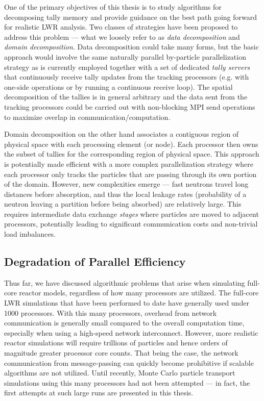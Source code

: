 One of the primary objectives of this thesis is to study algorithms for
decomposing tally memory and provide guidance on the best path going forward for
realistic LWR analysis. Two classes of strategies have been proposed to address
this problem --- what we loosely refer to as \emph{data decomposition} and
\emph{domain decomposition}. Data decomposition could take many forms, but the
basic approach would involve the same naturally parallel by-particle
parallelization strategy as is currently employed together with a set of
dedicated \emph{tally servers} that continuously receive tally updates from the
tracking processors (e.g. with one-side operations or by running a continuous
receive loop). The spatial decomposition of the tallies is in general arbitrary
and the data sent from the tracking processors could be carried out with
non-blocking MPI send operations to maximize overlap in
communication/computation.

Domain decomposition on the other hand associates a contiguous region of
physical space with each processing element (or node). Each processor then owns
the subset of tallies for the corresponding region of physical space. This
approach is potentially made efficient with a more complex parallelization
strategy where each processor only tracks the particles that are passing through
its own portion of the domain.  However, new complexities emerge --- fast
neutrons travel long distances before absorption, and thus the local leakage
rates (probability of a neutron leaving a partition before being absorbed) are
relatively large. This requires intermediate data exchange \emph{stages} where
particles are moved to adjacent processors, potentially leading to significant
communication costs and non-trivial load imbalances.

\subsection{Degradation of Parallel Efficiency}

Thus far, we have discussed algorithmic problems that arise when simulating
full-core reactor models, regardless of how many processors are utilized. The
full-core LWR simulations that have been performed to date
\cite{sna-leppanen-2010, physor-kelly-2012} have generally used under 1000
processors. With this many processors, overhead from network communication is
generally small compared to the overall computation time, especially when using
a high-speed network interconnect. However, more realistic reactor simulations
will require trillions of particles and hence orders of magnitude greater
processor core counts. That being the case, the network communication from
message-passing can quickly become prohibitive if scalable algorithms are not
utilized. Until recently, Monte Carlo particle transport simulations using this
many processors had not been attempted --- in fact, the first attempts at such
large runs are presented in this thesis.

